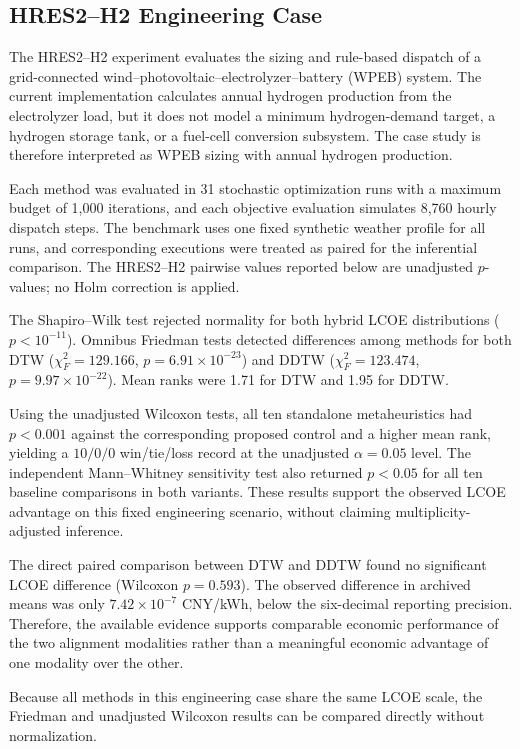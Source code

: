 \subsection{HRES2--H2 Engineering Case}
\label{sec:statistical-hres2-en}

The HRES2--H2 experiment evaluates the sizing and rule-based dispatch of a
grid-connected wind--photovoltaic--electrolyzer--battery (WPEB) system. The
current implementation calculates annual hydrogen production from the
electrolyzer load, but it does not model a minimum hydrogen-demand target, a
hydrogen storage tank, or a fuel-cell conversion subsystem. The case study is
therefore interpreted as WPEB sizing with annual hydrogen production.

Each method was evaluated in 31 stochastic optimization runs with a maximum budget of 1,000 iterations, and each objective evaluation simulates 8,760 hourly dispatch steps. The benchmark uses one fixed synthetic weather profile for all runs, and corresponding executions were treated as paired for the inferential comparison. The HRES2--H2 pairwise values reported below are unadjusted $p$-values; no Holm correction is applied.

The Shapiro--Wilk test rejected normality for both hybrid LCOE distributions
($p<10^{-11}$). Omnibus Friedman tests detected differences among methods for
both DTW ($\chi_F^2=129.166$, $p=6.91\times10^{-23}$) and DDTW
($\chi_F^2=123.474$, $p=9.97\times10^{-22}$). Mean ranks were 1.71 for DTW
and 1.95 for DDTW.

Using the unadjusted Wilcoxon tests, all ten standalone metaheuristics had
$p<0.001$ against the corresponding proposed control and a higher mean rank,
yielding a $10/0/0$ win/tie/loss record at the unadjusted $\alpha=0.05$ level.
The independent Mann--Whitney sensitivity test also returned $p<0.05$ for all
ten baseline comparisons in both variants. These results support the observed
LCOE advantage on this fixed engineering scenario, without claiming
multiplicity-adjusted inference.

The direct paired comparison between DTW and DDTW found no significant LCOE
difference (Wilcoxon $p=0.593$). The observed difference in archived means was
only $7.42\times10^{-7}$ CNY/kWh, below the six-decimal reporting precision.
Therefore, the available evidence supports comparable economic performance of
the two alignment modalities rather than a meaningful economic advantage of
one modality over the other.

Because all methods in this engineering case share the same LCOE scale, the
Friedman and unadjusted Wilcoxon results can be compared directly without
normalization.

